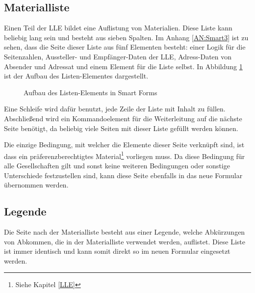 	\subsection{Materialliste}
	
	Einen Teil der \ac{LLE} bildet eine Auflistung von Materialien. Diese Liste kann beliebig lang sein und besteht aus sieben Spalten. Im Anhang \ref{AN:Smart3} ist zu sehen, dass die Seite dieser Liste aus fünf Elementen besteht: einer Logik für die Seitenzahlen, Aussteller- und Empfänger-Daten der \ac{LLE}, Adress-Daten von Absender und Adressat und einem Element für die Liste selbst.
	In Abbildung \ref{list_smart} ist der Aufbau des Listen-Elementes dargestellt.
	
	\begin{figure}[ht]
		\centering
		\caption{Aufbau des Listen-Elements in Smart Forms}
		\label{list_smart}
	\end{figure}
	
	Eine Schleife wird dafür benutzt, jede Zeile der Liste mit Inhalt zu füllen. Abschließend wird ein Kommandoelement für die Weiterleitung auf die nächste Seite benötigt, da beliebig viele Seiten mit dieser Liste gefüllt werden können.
	
	Die einzige Bedingung, mit welcher die Elemente dieser Seite verknüpft sind, ist dass ein präferenzberechtigtes Material\footnote{Siehe Kapitel \ref{LLE}} vorliegen muss. Da diese Bedingung für alle Gesellschaften gilt und sonst keine weiteren Bedingungen oder sonstige Unterschiede festzustellen sind, kann diese Seite ebenfalls in das neue Formular übernommen werden. 
	
	\subsection{Legende}
	\label{ist:leg}
	
	Die Seite nach der Materialliste besteht aus einer Legende, welche Abkürzungen von Abkommen, die in der Materialliste verwendet werden, auflistet. Diese Liste ist immer identisch und kann somit direkt so im neuen Formular eingesetzt werden.
	
